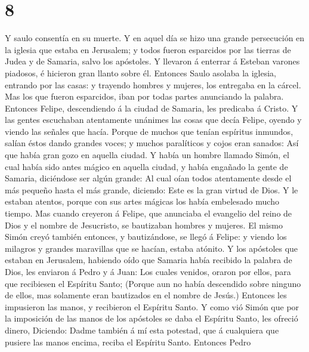\hypertarget{section-7}{%
\section{8}\label{section-7}}

 Y saulo consentía en su muerte. Y en aquel día se hizo una
grande persecución en la iglesia que estaba en Jerusalem; y todos fueron
esparcidos por las tierras de Judea y de Samaria, salvo los apóstoles.
 Y llevaron á enterrar á Esteban varones piadosos, é
hicieron gran llanto sobre él.  Entonces Saulo asolaba la
iglesia, entrando por las casas: y trayendo hombres y mujeres, los
entregaba en la cárcel.  Mas los que fueron esparcidos, iban
por todas partes anunciando la palabra.  Entonces Felipe,
descendiendo á la ciudad de Samaria, les predicaba á Cristo.
 Y las gentes escuchaban atentamente unánimes las cosas que
decía Felipe, oyendo y viendo las señales que hacía.  Porque
de muchos que tenían espíritus inmundos, salían éstos dando grandes
voces; y muchos paralíticos y cojos eran sanados:  Así que
había gran gozo en aquella ciudad.  Y había un hombre
llamado Simón, el cual había sido antes mágico en aquella ciudad, y
había engañado la gente de Samaria, diciéndose ser algún grande:
 Al cual oían todos atentamente desde el más pequeño hasta
el más grande, diciendo: Este es la gran virtud de Dios.  Y
le estaban atentos, porque con sus artes mágicas los había embelesado
mucho tiempo.  Mas cuando creyeron á Felipe, que anunciaba
el evangelio del reino de Dios y el nombre de Jesucristo, se bautizaban
hombres y mujeres.  El mismo Simón creyó también entonces,
y bautizándose, se llegó á Felipe: y viendo los milagros y grandes
maravillas que se hacían, estaba atónito.  Y los apóstoles
que estaban en Jerusalem, habiendo oído que Samaria había recibido la
palabra de Dios, les enviaron á Pedro y á Juan:  Los cuales
venidos, oraron por ellos, para que recibiesen el Espíritu Santo;
 (Porque aun no había descendido sobre ninguno de ellos,
mas solamente eran bautizados en el nombre de Jesús.) 
Entonces les impusieron las manos, y recibieron el Espíritu Santo.
 Y como vió Simón que por la imposición de las manos de los
apóstoles se daba el Espíritu Santo, les ofreció dinero, 
Diciendo: Dadme también á mí esta potestad, que á cualquiera que pusiere
las manos encima, reciba el Espíritu Santo.  Entonces Pedro
